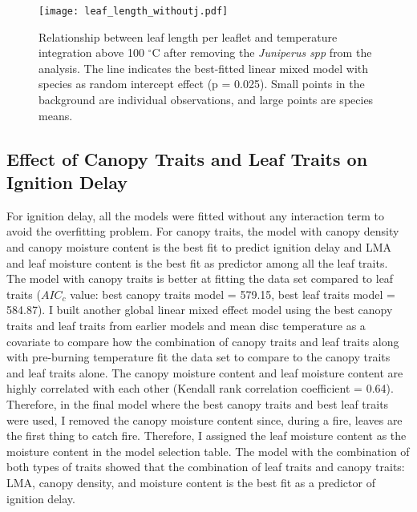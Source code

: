 \documentclass[12pt]{report}
\begin{document}
\begin{figure}
    \centering
    \texttt{[image: leaf\_length\_withoutj.pdf]}
    \caption{Relationship between leaf length per leaflet and temperature integration above 100 $^{\circ}$C after removing the \emph{Juniperus spp} from the analysis. The line indicates the best-fitted linear mixed model with species as random intercept effect (p = 0.025). Small points in the background are individual observations, and large points are species means.}
\end{figure}





\subsection{Effect of Canopy Traits and Leaf Traits on Ignition Delay}

For ignition delay, all the models were fitted without any interaction term to avoid the overfitting problem. For canopy traits, the model with canopy density and canopy moisture content is the best fit to predict ignition delay and LMA and leaf moisture content is the best fit as predictor among all the leaf traits. The model with canopy traits is better at fitting the data set compared to leaf traits ($AIC_{c}$ value: best canopy traits model = 579.15, best leaf traits model = 584.87). I built another global linear mixed effect model using the best canopy traits and leaf traits from earlier models and mean disc temperature as a covariate to compare how the combination of canopy traits and leaf traits along with pre-burning temperature fit the data set to compare to the canopy traits and leaf traits alone. The canopy moisture content and leaf moisture content are highly correlated with each other (Kendall rank correlation coefficient = 0.64). Therefore, in the final model where the best canopy traits and best leaf traits were used, I removed the canopy moisture content since, during a fire, leaves are the first thing to catch fire. Therefore, I assigned the leaf moisture content as the moisture content in the model selection table. The model with the combination of both types of traits showed that the combination of leaf traits and canopy traits: LMA, canopy density, and moisture content is the best fit as a predictor of ignition delay.
\end{document}
